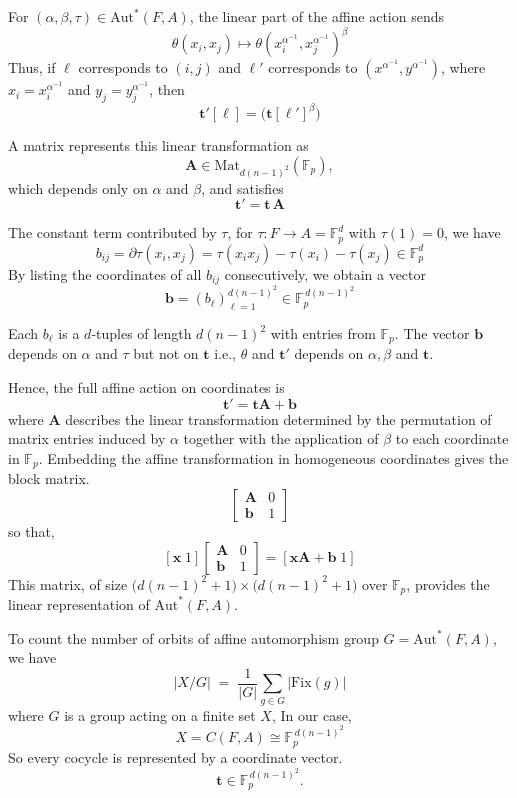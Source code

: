 \documentclass[12pt,a4paper]{amsart}
\theoremstyle{definition}
\begin{document}
For $(\alpha,\beta,\tau)\in\mathrm{Aut}^{\!*}(F,A)$, the linear part of the affine action sends
\[
\theta(x_{i},x_{j}) \longmapsto
\theta(x_{i}^{\alpha^{-1}},x_{j}^{\alpha^{-1}})^{\beta}
\]
Thus, if $\ell$ corresponds to $(i,j)$ and $\ell'$ corresponds to $(x^{\alpha^{-1}},y^{\alpha^{-1}})$, where $x_i=x_i^{\alpha^{-1}}$ and $y_j=y_{j}^{\alpha^{-1}}$, then
\[
\mathbf{t}'[\ell]=\bigl(\mathbf{t}[\ell']^{\beta}\bigr)
\]

A matrix represents this linear transformation as
\[
\mathbf{A}\in\mathrm{Mat}_{d(n-1)^{2}}(\mathbb{F}_{p}),
\]
which depends only on $\alpha$ and $\beta$, and satisfies
\[
\mathbf{t}' = \mathbf{t}\,\mathbf{A}
\]

The constant term contributed by $\tau$, for $\tau:F\to A=\mathbb{F}_p^d$ with $\tau(1)=0$, we have
\[
b_{ij}=\partial\tau(x_i,x_j)
 =\tau(x_ix_j)-\tau(x_i)-\tau(x_j)\in\mathbb{F}_p^d
\]
By listing the coordinates of all $b_{ij}$ consecutively, we obtain a vector
\[
\mathbf{b}=(b_\ell)_{\ell=1}^{d(n-1)^2}\in \mathbb{F}_p^{\,d(n-1)^2}
\]

Each $b_\ell$ is a $d$-tuples of length $d(n-1)^2$ with entries from $\mathbb{F}_{p}$.
The vector $\mathbf{b}$ depends on $\alpha$ and $\tau$ but not on $\mathbf{t}$ i.e., $\theta$ and $\mathbf{t'}$ depends on $\alpha, \beta$ and $\mathbf{t}$.

Hence, the full affine action on coordinates is
\begin{equation} \label{eq:t}
 \mathbf{t}'=\mathbf{t}\mathbf{A}+\mathbf{b} \tag{a}
\end{equation}
where $\mathbf{A}$ describes the linear transformation determined by the permutation of matrix entries induced by $\alpha$ together with the application of $\beta$ to each coordinate in $\mathbb{F}_{p}$. Embedding the affine transformation in homogeneous coordinates gives the block matrix.
\[
\begin{bmatrix}
\mathbf{A} & 0 \\[1mm]
\mathbf{b} & 1
\end{bmatrix}
\]
so that, 
\[
[\mathbf{x}\;1]
\begin{bmatrix}
\mathbf{A} & 0 \\[1mm]
\mathbf{b} & 1
\end{bmatrix}
=
[\mathbf{xA}+\mathbf{b}\;1]
\]
This matrix, of size $\bigl(d(n-1)^2+1\bigr)\times\bigl(d(n-1)^2+1\bigr)$ over $\mathbb{F}_{p}$, provides the linear representation of $\mathrm{Aut}^{\!*}(F,A)$.

To count the number of orbits of affine automorphism group $G=\mathrm{Aut}^{\!*}(F,A)$, we have
\[
 |X/G| \;=\; \frac{1}{|G|} \sum_{g\in G} |\mathrm{Fix}(g)|
\]
where $G$ is a group acting on a finite set $X$,
In our case,
\[
X=C(F,A)\cong \mathbb{F}_{p}^{\,d(n-1)^{2}}
\]
So every cocycle is represented by a coordinate vector.
\[
\mathbf{t}\in \mathbb{F}_{p}^{\,d(n-1)^{2}}.
\]
\end{document}
